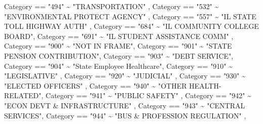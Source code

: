 \documentclass[
  letterpaper,
  DIV=11,
  numbers=noendperiod]{scrreport}
\newenvironment{Shaded}{\begin{snugshade}}{\end{snugshade}}
\newcommand{\NormalTok}[1]{\textcolor[rgb]{0.00,0.23,0.31}{#1}}
\newcommand{\SpecialCharTok}[1]{\textcolor[rgb]{0.37,0.37,0.37}{#1}}
\newcommand{\StringTok}[1]{\textcolor[rgb]{0.13,0.47,0.30}{#1}}
\begin{document}
\begin{Shaded}
\begin{Highlighting}[]
\NormalTok{             Category }\SpecialCharTok{==} \StringTok{"494"} \SpecialCharTok{\textasciitilde{}} \StringTok{"TRANSPORTATION"}\NormalTok{ ,}
\NormalTok{             Category }\SpecialCharTok{==} \StringTok{"532"} \SpecialCharTok{\textasciitilde{}} \StringTok{"ENVIRONMENTAL PROTECT AGENCY"}\NormalTok{ ,}
\NormalTok{             Category }\SpecialCharTok{==} \StringTok{"557"} \SpecialCharTok{\textasciitilde{}} \StringTok{"IL STATE TOLL HIGHWAY AUTH"}\NormalTok{ ,}
\NormalTok{             Category }\SpecialCharTok{==} \StringTok{"684"} \SpecialCharTok{\textasciitilde{}} \StringTok{"IL COMMUNITY COLLEGE BOARD"}\NormalTok{, }
\NormalTok{             Category }\SpecialCharTok{==} \StringTok{"691"} \SpecialCharTok{\textasciitilde{}} \StringTok{"IL STUDENT ASSISTANCE COMM"}\NormalTok{ ,}
\NormalTok{             Category }\SpecialCharTok{==} \StringTok{"900"} \SpecialCharTok{\textasciitilde{}} \StringTok{"NOT IN FRAME"}\NormalTok{,}
\NormalTok{             Category }\SpecialCharTok{==} \StringTok{"901"} \SpecialCharTok{\textasciitilde{}} \StringTok{"STATE PENSION CONTRIBUTION"}\NormalTok{,}
\NormalTok{             Category }\SpecialCharTok{==} \StringTok{"903"} \SpecialCharTok{\textasciitilde{}} \StringTok{"DEBT SERVICE"}\NormalTok{,}
\NormalTok{             Category }\SpecialCharTok{==} \StringTok{"904"} \SpecialCharTok{\textasciitilde{}} \StringTok{"State Employee Healthcare"}\NormalTok{,}
\NormalTok{             Category }\SpecialCharTok{==} \StringTok{"910"} \SpecialCharTok{\textasciitilde{}} \StringTok{"LEGISLATIVE"}\NormalTok{  ,}
\NormalTok{             Category }\SpecialCharTok{==} \StringTok{"920"} \SpecialCharTok{\textasciitilde{}} \StringTok{"JUDICIAL"}\NormalTok{ ,}
\NormalTok{             Category }\SpecialCharTok{==} \StringTok{"930"} \SpecialCharTok{\textasciitilde{}} \StringTok{"ELECTED OFFICERS"}\NormalTok{ , }
\NormalTok{             Category }\SpecialCharTok{==} \StringTok{"940"} \SpecialCharTok{\textasciitilde{}} \StringTok{"OTHER HEALTH{-}RELATED"}\NormalTok{, }
\NormalTok{             Category }\SpecialCharTok{==} \StringTok{"941"} \SpecialCharTok{\textasciitilde{}} \StringTok{"PUBLIC SAFETY"}\NormalTok{ ,}
\NormalTok{             Category }\SpecialCharTok{==} \StringTok{"942"} \SpecialCharTok{\textasciitilde{}} \StringTok{"ECON DEVT \& INFRASTRUCTURE"}\NormalTok{ ,}
\NormalTok{             Category }\SpecialCharTok{==} \StringTok{"943"} \SpecialCharTok{\textasciitilde{}} \StringTok{"CENTRAL SERVICES"}\NormalTok{,}
\NormalTok{             Category }\SpecialCharTok{==} \StringTok{"944"} \SpecialCharTok{\textasciitilde{}} \StringTok{"BUS \& PROFESSION REGULATION"}\NormalTok{ ,}

\end{Highlighting}
\end{Shaded}
\end{document}
